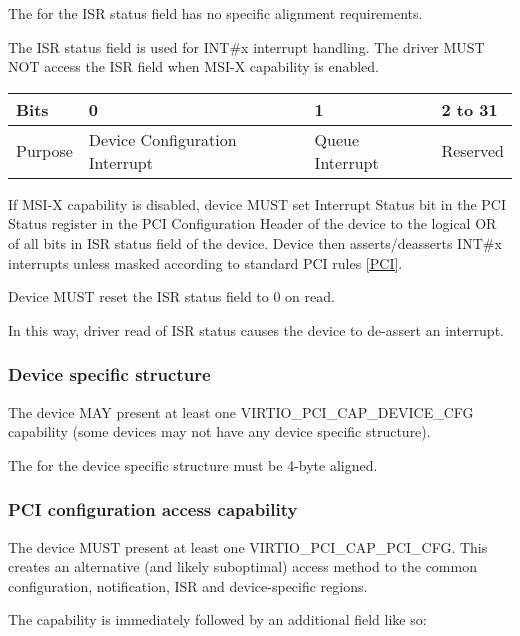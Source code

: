 The  for the ISR status field has no specific alignment requirements.

The ISR status field is used for INT\#x interrupt handling.
The driver MUST NOT access the ISR field when MSI-X capability
is enabled.

\begin{tabular}{ |l||l|l|l| }
\hline
Bits       & 0                               & 1               &  2 to 31 \\
\hline
Purpose    & Device Configuration Interrupt  & Queue Interrupt & Reserved \\
\hline
\end{tabular}

If MSI-X capability is disabled, device MUST set Interrupt Status
bit in the PCI Status register in the PCI Configuration Header of
the device to the logical OR of all bits in ISR status field of
the device.  Device then asserts/deasserts INT\#x interrupts unless masked
according to standard PCI rules \hyperref[intro:PCI]{[PCI]}.

Device MUST reset the ISR status field to 0 on read.

In this way, driver read of ISR status causes the device to de-assert
an interrupt.

\subsubsection{Device specific structure}\label{sec:Virtio Transport Options / Virtio Over PCI Bus / PCI Device Layout / Device specific structure}

The device MAY present at least one VIRTIO_PCI_CAP_DEVICE_CFG capability (some
devices may not have any device specific structure).

The  for the device specific structure must be 4-byte aligned.

\subsubsection{PCI configuration access capability}\label{sec:Virtio Transport Options / Virtio Over PCI Bus / PCI Device Layout / PCI configuration access capability}

The device MUST present at least one VIRTIO_PCI_CAP_PCI_CFG.  This
creates an alternative (and likely suboptimal) access method to the
common configuration, notification, ISR and device-specific regions.

The capability is immediately followed by an additional field like so:

